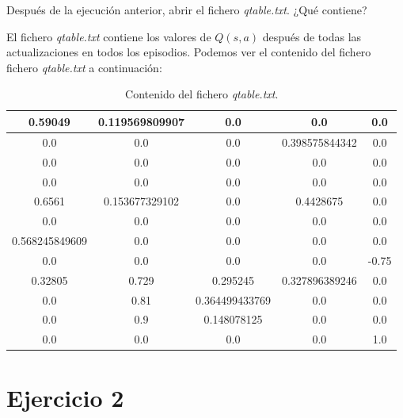 \documentclass[11pt]{exam}
\begin{document}
\begin{questions}
{ \question Después de la ejecución anterior, abrir el fichero \textit{qtable.txt}. ¿Qué contiene?}

El fichero \textit{qtable.txt} contiene los valores de $Q(s,a)$ después de todas las actualizaciones en todos los episodios. Podemos ver el contenido del fichero fichero \textit{qtable.txt} a continuación:

\renewcommand{\tablename}{Tabla}

\begin{table}[h]
	\centering
	\begin{tabular}{|c|c|c|c|c|}
		\hline
		0.59049        & 0.119569809907 & 0.0            & 0.0            & 0.0   \\ \hline
		0.0            & 0.0            & 0.0            & 0.398575844342 & 0.0   \\ \hline
		0.0            & 0.0            & 0.0            & 0.0            & 0.0   \\ \hline
		0.0            & 0.0            & 0.0            & 0.0            & 0.0   \\ \hline
		0.6561         & 0.153677329102 & 0.0            & 0.4428675      & 0.0   \\ \hline
		0.0            & 0.0            & 0.0            & 0.0            & 0.0   \\ \hline
		0.568245849609 & 0.0            & 0.0            & 0.0            & 0.0   \\ \hline
		0.0            & 0.0            & 0.0            & 0.0            & -0.75 \\ \hline
		0.32805        & 0.729          & 0.295245       & 0.327896389246 & 0.0   \\ \hline
		0.0            & 0.81           & 0.364499433769 & 0.0            & 0.0   \\ \hline
		0.0            & 0.9            & 0.148078125    & 0.0            & 0.0   \\ \hline
		0.0            & 0.0            & 0.0            & 0.0            & 1.0   \\ \hline
	\end{tabular}
	\caption{Contenido del fichero \textit{qtable.txt}.}
	\label{table_2}
\end{table}

\end{questions}

\section*{Ejercicio 2}
\end{document}
